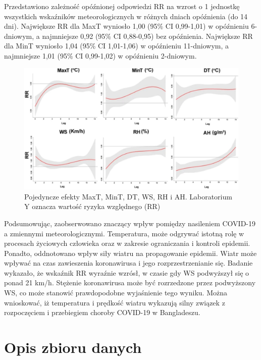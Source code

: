 \documentclass[polish, twoside, 12pt, a4paper]{article}
\theoremstyle{definition}
\theoremstyle{plain}
\theoremstyle{remark}
\begin{document}
Przedstawiono zależność opóźnionej odpowiedzi RR na wzrost o 1 jednostkę wszystkich wskaźników meteorologicznych w różnych dniach opóźnienia (do 14 dni). Największe RR dla MaxT wyniosło 1,00 (95\% CI 0,99-1,01) w opóźnieniu 6-dniowym, a najmniejsze 0,92 (95\% CI 0,88-0,95) bez opóźnienia. Największe RR dla MinT wyniosło 1,04 (95\% CI 1,01-1,06) w opóźnieniu 11-dniowym, a najmniejsze 1,01 (95\% CI 0,99-1,02) w opóźnieniu 2-dniowym. 

\begin{figure}[H]
\centering
\includegraphics[width=15cm]{clmate-factors.jpg}
\caption{Pojedyncze efekty MaxT, MinT, DT, WS, RH i AH. Laboratorium Y oznacza wartość ryzyka względnego (RR)}
\end{figure}

Podsumowując, zaobserwowano znaczący wpływ pomiędzy nasileniem COVID-19 a zmiennymi meteorologicznymi. Temperatura, może odgrywać istotną rolę w procesach życiowych człowieka oraz w zakresie ograniczania i kontroli epidemii. Ponadto, oddnotowano wpływ siły wiatru na propagowanie epidemii. Wiatr może wpływać na czas zawieszenia koronawirusa i jego rozprzestrzenianie się. Badanie wykazało, że wskaźnik RR wyraźnie wzrósł, w czasie gdy WS podwyższył się o ponad 21 km/h. Stężenie koronawirusa może być rozrzedzone przez podwyższony WS, co może stanowić prawdopodobne wyjaśnienie tego wyniku. Można wnioskować, iż temperatura i prędkość wiatru wykazują silny związek z rozpoczęciem i przebiegiem choroby COVID-19 w Bangladeszu. \cite{hasanuzzaman2020}



\clearpage
\section{Opis zbioru danych}
\label{chapter:data-set}
\end{document}
